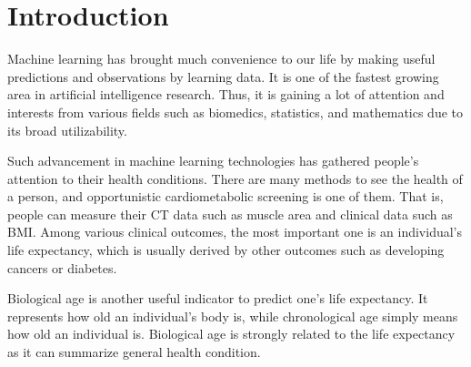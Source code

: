 \section{Introduction}
\label{sec:intro}

Machine learning has brought much convenience to our life by making useful predictions and observations by learning data.
It is one of the fastest growing area in artificial intelligence research.
Thus, it is gaining a lot of attention and interests from various fields such as biomedics, statistics, and mathematics due to its broad utilizability.

Such advancement in machine learning technologies has gathered people's attention to their health conditions.
There are many methods to see the health of a person, and opportunistic cardiometabolic screening is one of them.
That is, people can measure their CT data such as muscle area and clinical data such as BMI.
Among various clinical outcomes, the most important one is an individual's life expectancy, which is usually derived by other outcomes such as developing cancers or diabetes.


Biological age is another useful indicator to predict one's life expectancy.
It represents how old an individual's body is, while chronological age simply means how old an individual is.
Biological age is strongly related to the life expectancy as it can summarize general health condition.


